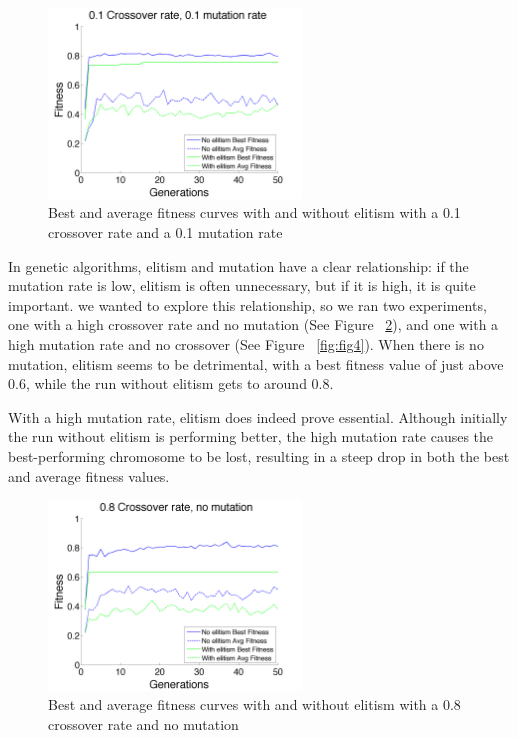 \documentclass[11pt]{article}
\begin{document}
\begin{figure}[H]
 \centering
  \includegraphics[width=0.6\textwidth,height=0.2\textheight]{figures/fitness01mut01cross.png}
  \caption{Best and average fitness curves with and without elitism with a 0.1 crossover rate and a 0.1 mutation rate}
  \label{fig:fig2}  
\end{figure}

In genetic algorithms, elitism and mutation have a clear relationship: if the mutation rate is low, elitism is often unnecessary, but if it is high, it is quite important. we wanted to explore this relationship, so we ran two experiments, one with a high crossover rate and no mutation (See Figure ~\ref{fig:fig3}), and one with a high mutation rate and no crossover (See Figure ~\ref{fig:fig4}). When there is no mutation, elitism seems to be detrimental, with a best fitness value of just above 0.6, while the run without elitism gets to around 0.8. 

With a high mutation rate, elitism does indeed prove essential. Although initially the run without elitism is performing better, the high mutation rate causes the best-performing chromosome to be lost, resulting in a steep drop in both the best and average fitness values.
 
\begin{figure}[H]
 \centering
  \includegraphics[width=0.6\textwidth,height=0.2\textheight]{figures/fitness0mut08cross.png}
  \caption{Best and average fitness curves with and without elitism with a 0.8 crossover rate and no mutation}
  \label{fig:fig3}  
\end{figure}
\end{document}
